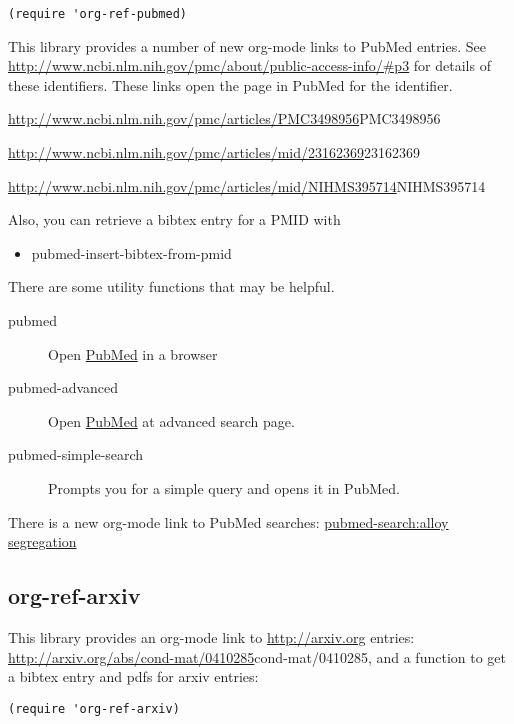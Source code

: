 \documentclass[11pt]{article}
\begin{document}
{\begin{verbatim}
(require 'org-ref-pubmed)
\end{verbatim}

This library provides a number of new org-mode links to PubMed entries. See \url{http://www.ncbi.nlm.nih.gov/pmc/about/public-access-info/#p3} for details of these identifiers. These links open the page in PubMed for the identifier.

\url{http://www.ncbi.nlm.nih.gov/pmc/articles/PMC3498956}{PMC3498956}

\url{http://www.ncbi.nlm.nih.gov/pmc/articles/mid/23162369}{23162369}

\url{http://www.ncbi.nlm.nih.gov/pmc/articles/mid/NIHMS395714}{NIHMS395714}

Also, you can retrieve a bibtex entry for a PMID with

\begin{itemize}
\item pubmed-insert-bibtex-from-pmid
\end{itemize}

There are some utility functions that may be helpful.

\begin{description}
\item[{pubmed}] Open \href{http://www.ncbi.nlm.nih.gov/pubmed}{PubMed} in a browser
\item[{pubmed-advanced}] Open \href{http://www.ncbi.nlm.nih.gov/pubmed/advanced}{PubMed} at advanced search page.
\item[{pubmed-simple-search}] Prompts you for a simple query and opens it in PubMed.
\end{description}

There is a new org-mode link to PubMed searches: \href{http://www.ncbi.nlm.nih.gov/pubmed/?term=alloy%20segregation}{pubmed-search:alloy segregation}

\subsection{org-ref-arxiv}
\label{sec:orgheadline24}

This library provides an org-mode link to \url{http://arxiv.org} entries:  \url{http://arxiv.org/abs/cond-mat/0410285}{cond-mat/0410285}, and a function to get a bibtex entry and pdfs for arxiv entries:

\begin{verbatim}
(require 'org-ref-arxiv)
\end{verbatim}

}
\end{document}
